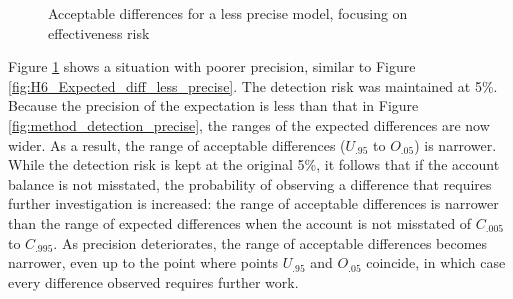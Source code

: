 \documentclass[12pt,a4paper]{memoir}
\begin{document}
\begin{figure}[htbp]
\begin{center}
\caption{Acceptable differences for a less precise model, focusing on effectiveness risk}

\label{fig:method_detection_less_precise}
\end{center}
\end{figure}

\bigskip
Figure \ref{fig:method_detection_less_precise} shows a situation with poorer precision, similar to Figure \ref{fig:H6_Expected_diff_less_precise}. The detection risk was maintained at 5\%.
Because the precision of the expectation is less than that in Figure \ref{fig:method_detection_precise}, the ranges of the expected differences are now wider. As a result, the range of acceptable differences ($U_{.95}$ to $O_{.05}$) is narrower. While the detection risk is kept at the original 5\%, it follows that if the account balance is not misstated, the probability of observing a difference that requires further investigation is increased: the range of acceptable differences is narrower than the range of expected differences when the account is not misstated of $C_{.005}$ to $C_{.995}$. As precision deteriorates, the range of acceptable differences becomes narrower, even up to the point where points $U_{.95}$ and $O_{.05}$ coincide, in which case every difference observed requires further work.
\end{document}
